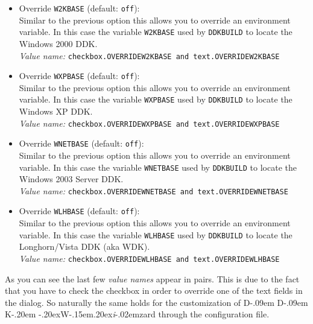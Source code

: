 \documentclass[a4paper,titlepage]{report}
\newcommand{\default}[1]{\textcolor[gray]{0.40}{(default: \texttt{#1})}}
\newcommand{\option}[1]{\textcolor[rgb]{0.00,0.20,0.20}{\textsf{#1}}}
\newcommand{\optiondeco}[1]{#1\vspace{0.1cm}}
\newcommand{\inioption}[1]{\\\textcolor[rgb]{0.00,0.00,0.40}{\textsl{Value name:} \texttt{#1}}}
\def\ddkwiz{D\kern-.09em D\kern-.09em K\kern-.20em \raise-.20ex\hbox{W}\kern-.15em\raise.20ex\hbox{\it{i}}\kern-.02em{zard}}
\begin{document}
\begin{itemize}
  If you enable this option, you can override the value of the environment variable
  \texttt{DDKBUILD\_PATH} for the created projects. This allows you for example
  to customize \texttt{DDKBUILD} and point the projects to your own version of
  \texttt{DDKBUILD}\footnote{\ddkwiz{} still makes the assumption that the
  options are compatible with OSRs \texttt{DDKBUILD} versions.}.\\
  Note that you have to give the full path including the filename of your
  \texttt{DDKBUILD} script.
  \inioption{checkbox.OVERRIDEDDKBUILD \textrm{and} text.OVERRIDEDDKBUILD}
  \item \optiondeco{\option{Override \texttt{W2KBASE}} \default{off}:}\\
  Similar to the previous option this allows you to override an environment
  variable.
  In this case the variable \texttt{W2KBASE} used by \texttt{DDKBUILD} to
  locate the Windows 2000 DDK.
  \inioption{checkbox.OVERRIDEW2KBASE \textrm{and} text.OVERRIDEW2KBASE}
  \item \optiondeco{\option{Override \texttt{WXPBASE}} \default{off}:}\\
  Similar to the previous option this allows you to override an environment
  variable.
  In this case the variable \texttt{WXPBASE} used by \texttt{DDKBUILD} to
  locate the Windows XP DDK.
  \inioption{checkbox.OVERRIDEWXPBASE \textrm{and} text.OVERRIDEWXPBASE}
  \item \optiondeco{\option{Override \texttt{WNETBASE}} \default{off}:}\\
  Similar to the previous option this allows you to override an environment
  variable.
  In this case the variable \texttt{WNETBASE} used by \texttt{DDKBUILD} to
  locate the Windows 2003 Server DDK.
  \inioption{checkbox.OVERRIDEWNETBASE \textrm{and} text.OVERRIDEWNETBASE}
  \item \optiondeco{\option{Override \texttt{WLHBASE}} \default{off}:}\\
  Similar to the previous option this allows you to override an environment
  variable.
  In this case the variable \texttt{WLHBASE} used by \texttt{DDKBUILD} to
  locate the Longhorn/Vista DDK (aka WDK).
  \inioption{checkbox.OVERRIDEWLHBASE \textrm{and} text.OVERRIDEWLHBASE}
\end{itemize}

As you can see the last few \emph{value names} appear in pairs. This is due to the
fact that you have to check the checkbox in order to override one of the
text fields in the dialog. So naturally the same holds for the customization
of \ddkwiz{} through the configuration file.\\
\end{document}
